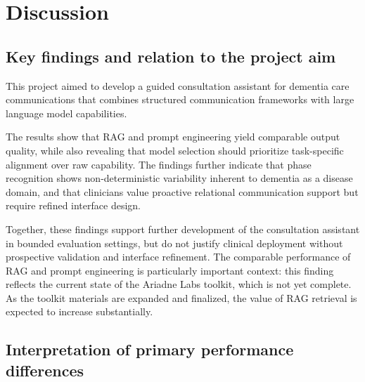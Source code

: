 \newpage
\section{Discussion}\label{sec:discussion}


\subsection{Key findings and relation to the project aim}

This project aimed to develop a guided consultation assistant for dementia care communications that combines structured communication frameworks with large language model capabilities.

The results show that RAG and prompt engineering yield comparable output quality, while also revealing that model selection should prioritize task-specific alignment over raw capability. The findings further indicate that phase recognition shows non-deterministic variability inherent to dementia as a disease domain, and that clinicians value proactive relational communication support but require refined interface design.

Together, these findings support further development of the consultation assistant in bounded evaluation settings, but do not justify clinical deployment without prospective validation and interface refinement. The comparable performance of RAG and prompt engineering is particularly important context: this finding reflects the current state of the Ariadne Labs toolkit, which is not yet complete. As the toolkit materials are expanded and finalized, the value of RAG retrieval is expected to increase substantially.

\subsection{Interpretation of primary performance differences}

